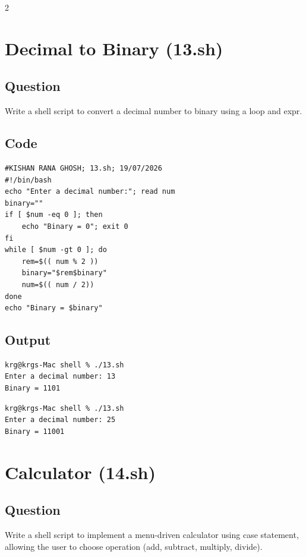 \documentclass[a4paper,12pt]{article}
\begin{document}
\begin{multicols}{2}

\section{Decimal to Binary (13.sh)}
\subsection*{Question}
Write a shell script to convert a decimal number to binary using a loop and expr.

\subsection*{Code}
\begin{lstlisting}[style=bashstyle]
#KISHAN RANA GHOSH; 13.sh; 19/07/2026
#!/bin/bash
echo "Enter a decimal number:"; read num
binary=""
if [ $num -eq 0 ]; then
    echo "Binary = 0"; exit 0
fi
while [ $num -gt 0 ]; do
    rem=$(( num % 2 ))
    binary="$rem$binary"
    num=$(( num / 2))
done
echo "Binary = $binary"
\end{lstlisting}

\subsection*{Output}
\begin{lstlisting}[style=outputstyle]
krg@krgs-Mac shell % ./13.sh
Enter a decimal number: 13
Binary = 1101
\end{lstlisting}
\begin{lstlisting}[style=outputstyle]
krg@krgs-Mac shell % ./13.sh
Enter a decimal number: 25
Binary = 11001
\end{lstlisting}

\columnbreak

\section{Calculator (14.sh)}
\subsection*{Question}
Write a shell script to implement a menu-driven calculator using case statement, allowing the user to choose operation (add, subtract, multiply, divide).


\end{multicols}
\end{document}
